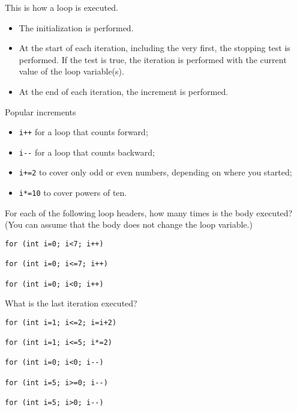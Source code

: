 This is how a loop is executed.
\begin{itemize}
\item The initialization is performed.
\item At the start of each iteration, including the very first, the
  stopping test is performed. If the test is true, the iteration is
  performed with the current value of the loop variable(s).
\item At the end of each iteration, the increment is performed.
\end{itemize}

\begin{block}{Popular increments}
  \label{sl:more-increment}
  \begin{itemize}
  \item \lstinline{i++} for a loop that counts forward;
  \item \lstinline{i--} for a loop that counts backward;
  \item \lstinline{i+=2} to cover only odd or even numbers, depending on
    where you started;
  \item \lstinline{i*=10} to cover powers of ten.
  \end{itemize}
\end{block}

\begin{review}
  \label{q:loop}
  For each of the following loop headers, how many times is the body
  executed? (You can assume that the body does not change the loop variable.)

\begin{lstlisting}
for (int i=0; i<7; i++)

for (int i=0; i<=7; i++)

for (int i=0; i<0; i++)
\end{lstlisting}

What is the last iteration executed?
\begin{lstlisting}
for (int i=1; i<=2; i=i+2)

for (int i=1; i<=5; i*=2)

for (int i=0; i<0; i--)

for (int i=5; i>=0; i--)

for (int i=5; i>0; i--)
\end{lstlisting}
\end{review}


